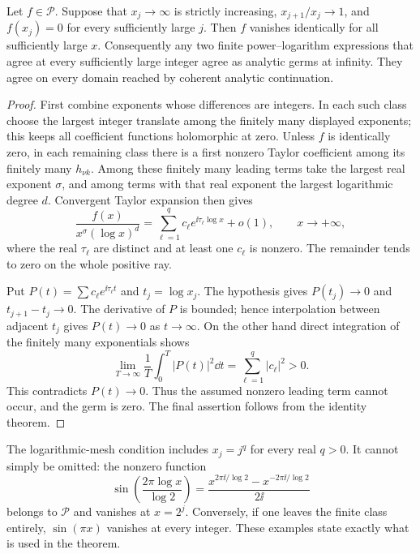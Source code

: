 \begin{theorem}
\label{sampling:unique}
Let $f\in\mathscr P$. Suppose that $x_j\to\infty$ is strictly
increasing, $x_{j+1}/x_j\to1$, and $f(x_j)=0$ for every sufficiently
large $j$. Then $f$ vanishes identically for all sufficiently large $x$.
Consequently any two finite power--logarithm expressions that agree at
every sufficiently large integer agree as analytic germs at infinity.
They agree on every domain reached by coherent analytic continuation.
\end{theorem}
\begin{proof}
First combine exponents whose differences are integers. In each such
class choose the largest integer translate among the finitely many
displayed exponents; this keeps all coefficient functions holomorphic
at zero. Unless $f$ is identically zero, in each remaining class there
is a first nonzero Taylor coefficient among its finitely many
$h_{\nu k}$. Among these finitely many leading terms take the largest
real exponent $\sigma$, and among terms with that real exponent the
largest logarithmic degree $d$. Convergent Taylor expansion then gives
\begin{equation}\label{sampling:leading}
 \frac{f(x)}{x^\sigma(\log x)^d}
   =\sum_{\ell=1}^q c_\ell e^{\ii\tau_\ell\log x}+o(1),
 \qquad x\to+\infty,
\end{equation}
where the real $\tau_\ell$ are distinct and at least one $c_\ell$ is
nonzero. The remainder tends to zero on the whole positive ray.

Put $P(t)=\sum c_\ell e^{\ii\tau_\ell t}$ and $t_j=\log x_j$.
The hypothesis gives $P(t_j)\to0$ and $t_{j+1}-t_j\to0$.
The derivative of $P$ is bounded; hence interpolation between adjacent
$t_j$ gives $P(t)\to0$ as $t\to\infty$. On the other hand direct
integration of the finitely many exponentials shows
\[
 \lim_{T\to\infty}\frac1T\int_0^T|P(t)|^2\dd t
       =\sum_{\ell=1}^q|c_\ell|^2>0.
\]
This contradicts $P(t)\to0$. Thus the assumed nonzero leading term
cannot occur, and the germ is zero. The final assertion follows from
the identity theorem.
\end{proof}

The logarithmic-mesh condition includes $x_j=j^q$ for every real $q>0$.
It cannot simply be omitted: the nonzero function
\[
 \sin\left(\frac{2\pi\log x}{\log 2}\right)
 =\frac{x^{2\pi\ii/\log2}-x^{-2\pi\ii/\log2}}{2\ii}
\]
belongs to $\mathscr P$ and vanishes at $x=2^j$. Conversely, if
one leaves the finite class entirely, $\sin(\pi x)$ vanishes at every
integer. These examples state exactly what is used in the theorem.

